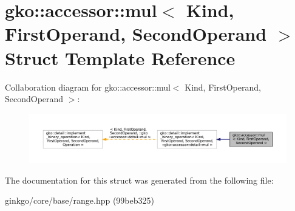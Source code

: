 \hypertarget{structgko_1_1accessor_1_1mul}{}\section{gko\+:\+:accessor\+:\+:mul$<$ Kind, First\+Operand, Second\+Operand $>$ Struct Template Reference}
\label{structgko_1_1accessor_1_1mul}


Collaboration diagram for gko\+:\+:accessor\+:\+:mul$<$ Kind, First\+Operand, Second\+Operand $>$\+:
\nopagebreak
\begin{figure}[H]
\begin{center}
\leavevmode
\includegraphics[width=350pt]{structgko_1_1accessor_1_1mul__coll__graph}
\end{center}
\end{figure}


The documentation for this struct was generated from the following file\+:\begin{DoxyCompactItemize}
\item 
ginkgo/core/base/range.\+hpp (99beb325)\end{DoxyCompactItemize}
